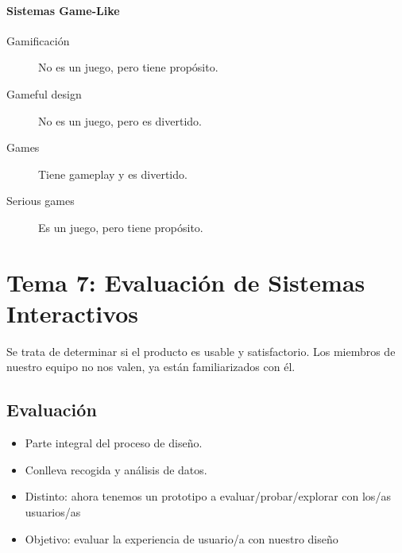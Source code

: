 \documentclass[12pt, twoside, openright]{report} %
\begin{document}
\subsubsection{Sistemas Game-Like}
\begin{description}
	\item[Gamificación] No es un juego, pero tiene propósito.
	\item[Gameful design] No es un juego, pero es divertido.
	\item[Games] Tiene gameplay y es divertido.
	\item[Serious games] Es un juego, pero tiene propósito.
\end{description}

\chapter{Tema 7: Evaluación de Sistemas Interactivos}
Se trata de determinar si el producto es usable y satisfactorio. Los miembros de nuestro equipo no nos valen, ya están familiarizados con él.

\section{Evaluación}
\begin{itemize}
	\item Parte integral del proceso de diseño.
	\item Conlleva recogida y análisis de datos.
	\item Distinto: ahora tenemos un prototipo a evaluar/probar/explorar con los/as usuarios/as
	\item Objetivo: evaluar la experiencia de usuario/a con nuestro diseño
\end{itemize}
\end{document}
